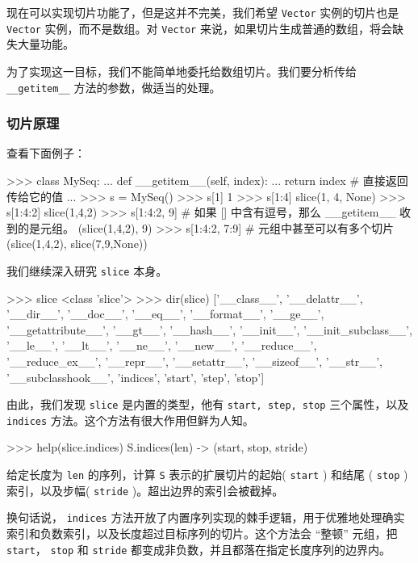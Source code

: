 现在可以实现切片功能了，但是这并不完美，我们希望 \texttt{Vector} 实例的切片也是 \texttt{Vector} 实例，而不是数组。对 \texttt{Vector} 来说，如果切片生成普通的数组，将会缺失大量功能。

为了实现这一目标，我们不能简单地委托给数组切片。我们要分析传给 \texttt{\_\_getitem\_\_} 方法的参数，做适当的处理。

\subsubsection{切片原理}

查看下面例子：
\begin{python}
>>> class MySeq:
...     def __getitem__(self, index):
...         return index    # 直接返回传给它的值
...
>>> s = MySeq()
>>> s[1]    
1
>>> s[1:4]
slice(1, 4, None)
>>> s[1:4:2]
slice(1,4,2)
>>> s[1:4:2, 9]             # 如果 [] 中含有逗号，那么 __getitem__ 收到的是元组。
(slice(1,4,2), 9)
>>> s[1:4:2, 7:9]           # 元组中甚至可以有多个切片
(slice(1,4,2), slice(7,9,None))
\end{python}

我们继续深入研究 \texttt{slice} 本身。

\begin{python}
>>> slice 
<class 'slice'>
>>> dir(slice)
['__class__', '__delattr__', '__dir__', '__doc__', '__eq__', '__format__', '__ge__', '__getattribute__', '__gt__', '__hash__', '__init__', '__init_subclass__', '__le__', '__lt__', '__ne__', '__new__', '__reduce__', '__reduce_ex__', '__repr__', '__setattr__', '__sizeof__', '__str__', '__subclasshook__', 'indices', 'start', 'step', 'stop']
\end{python}

由此，我们发现 \texttt{slice} 是内置的类型，他有 \texttt{start, step, stop} 三个属性，以及 \texttt{indices} 方法。这个方法有很大作用但鲜为人知。

\begin{python}
>>> help(slice.indices)
S.indices(len) -> (start, stop, stride)
\end{python}

给定长度为 \texttt{len} 的序列，计算 \texttt{S} 表示的扩展切片的起始( \texttt{start} ) 和结尾 ( \texttt{stop} )索引，以及步幅( \texttt{stride} )。超出边界的索引会被截掉。

换句话说， \texttt{indices} 方法开放了内置序列实现的棘手逻辑，用于优雅地处理确实索引和负数索引，以及长度超过目标序列的切片。这个方法会 ``整顿'' 元组，把 \texttt{start}， \texttt{stop} 和 \texttt{stride} 都变成非负数，并且都落在指定长度序列的边界内。

